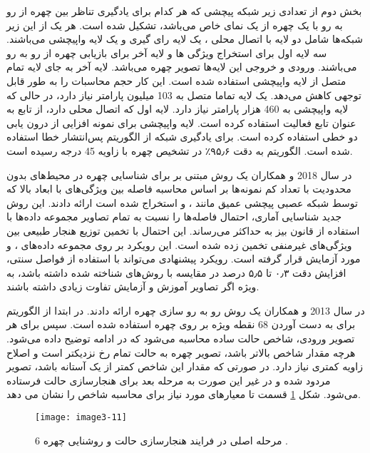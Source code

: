 \noindent
بخش دوم از تعدادی زیر شبکه پیچشی که هر کدام برای یادگیری تناظر بین چهره از رو به رو با یک چهره از یک نمای خاص می‌باشد، تشکیل شده است. هر یک از این زیر شبکه‌ها شامل دو لایه با اتصال محلی ، یک لایه رای گیری و یک لایه واپیچشی می‌باشند. سه لایه اول برای استخراج ویژگی ها و لایه آخر برای بازیابی چهره از رو به رو می‌باشند. ورودی و خروجی این لایه‌ها تصویر چهره می‌باشد. لایه آخر به جای لایه تمام متصل از لایه واپیچشی استفاده شده است. این کار حجم محاسبات را به طور قابل توجهی کاهش می‌دهد. یک لایه تماما متصل به 103 میلیون پارامتر نیاز دارد، در حالی که لایه واپیچشی به 460 هزار پارامتر نیاز دارد. لایه اول که اتصال محلی دارد، از تابع  به عنوان تابع فعالیت استفاده کرده است. لایه واپیچشی برای نمونه افزایی از درون یابی دو خطی استفاده کرده است. برای یادگیری شبکه از الگوریتم پس‌انتشار خطا  استفاده شده است. الگوریتم  به دقت ۹۵٫۶٪ در تشخیص چهره با زاویه 45 درجه رسیده است.

\noindent
در سال 2018  و همکاران \cite{SAVCHENKO2018170} یک روش مبتنی بر   برای شناسایی چهره در محیط‌های بدون محدودیت با تعداد کم نمونه‌ها بر اساس محاسبه فاصله بین ویژگی‌های با ابعاد بالا که توسط شبکه عصبی پیچشی عمیق مانند ،  و  استخراج شده است ارائه دادند. این روش جدید شناسایی آماری، احتمال فاصله‌ها را نسبت به تمام تصاویر مجموعه داده‌ها با استفاده از قانون بیز به حداکثر می‌رساند. این احتمال با تخمین توزیع هنجار طبیعی  بین ویژگی‌های غیرمنفی تخمین زده شده است. این رویکرد بر روی مجموعه داده‌های ،  و  مورد آزمایش قرار گرفته است. رویکرد پیشنهادی می‌تواند با استفاده از فواصل سنتی، افزایش دقت ۰٫۳ تا ۵٫۵ درصد در مقایسه با روش‌های شناخته شده داشته باشد، به ویژه اگر تصاویر آموزش و آزمایش تفاوت زیادی داشته باشند.

\noindent
در سال 2013  و همکاران \cite{6196234} یک روش رو به رو سازی چهره ارائه دادند. در ابتدا از الگوریتم   برای به دست آوردن 68 نقطه ویژه بر روی چهره استفاده شده است. سپس برای هر تصویر ورودی، شاخص حالت ساده   محاسبه می‌شود که در ادامه توضیح داده می‌شود. هرچه مقدار شاخص  بالاتر باشد، تصویر چهره به حالت تمام رخ نزدیکتر است و اصلاح زاویه کمتری نیاز دارد. در صورتی که مقدار این شاخص کمتر از یک آستانه باشد، تصویر مردود شده و در غیر این صورت به مرحله بعد برای هنجارسازی حالت فرستاده می‌شود. شکل \ref{image3-11} قسمت  تا  معیارهای مورد نیاز برای محاسبه شاخص  را نشان می دهد.

\begin{figure}[h]
\centering
  \texttt{[image: image3-11]}
  \caption{6 مرحله اصلی در فرایند هنجارسازی حالت و روشنایی چهره \cite{6196234}.}
  \label{image3-11}
\end{figure}

